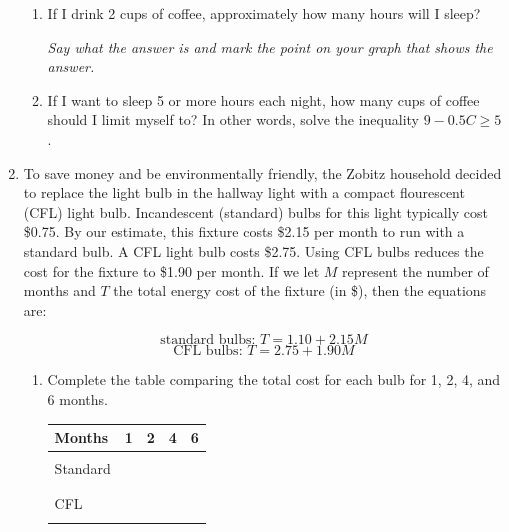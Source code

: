 \documentclass[12pt]{article}
\begin{document}
\begin{enumerate}
\begin{enumerate}
\item If I drink 2 cups of coffee, approximately how many hours will I sleep?

\emph{Say what the answer is and mark the point on your graph that shows the answer.}
\vfill
\item  If I want to sleep 5 or more hours each night, how many cups of coffee should I limit myself to?  In other words, solve the inequality $9-0.5C \ge 5$.
\vfill
\vfill
\vfill
\end{enumerate}

\newpage

\item To save money and be environmentally friendly, the Zobitz household decided to replace the light bulb in the hallway light with a compact flourescent (CFL) light bulb.  Incandescent (standard) bulbs for this light typically cost \$0.75.  By our estimate, this fixture costs \$2.15 per month to run with a standard bulb.  A CFL light bulb costs \$2.75.  Using CFL bulbs reduces the cost for the fixture to  \$1.90 per month.    If we let $M$ represent the number of months and $T$ the total energy cost of the fixture (in \$), then the equations are:

$$\text{standard bulbs:  }T = 1.10 + 2.15M$$
$$\text{CFL bulbs:  }T = 2.75 + 1.90M$$

\begin{enumerate}
\item Complete the table comparing the total cost for each bulb for 1, 2, 4, and 6 months.


\begin{center}
\begin{tabular} {|l |c |c |c |c |} \hline
Months &\hspace{.25in} 1\hspace{.25in} & \hspace{.25in}2\hspace{.25in} & \hspace{.25in}4\hspace{.25in} &\hspace{.25in}6\hspace{.25in} \\ \hline
&&&& \\ 
Standard &&&& \\ 
&&&& \\ \hline
&&&& \\ 
CFL&&&& \\  
&&&& \\ \hline
\end{tabular}
\end{center}



\end{enumerate}
\end{enumerate}
\end{document}
